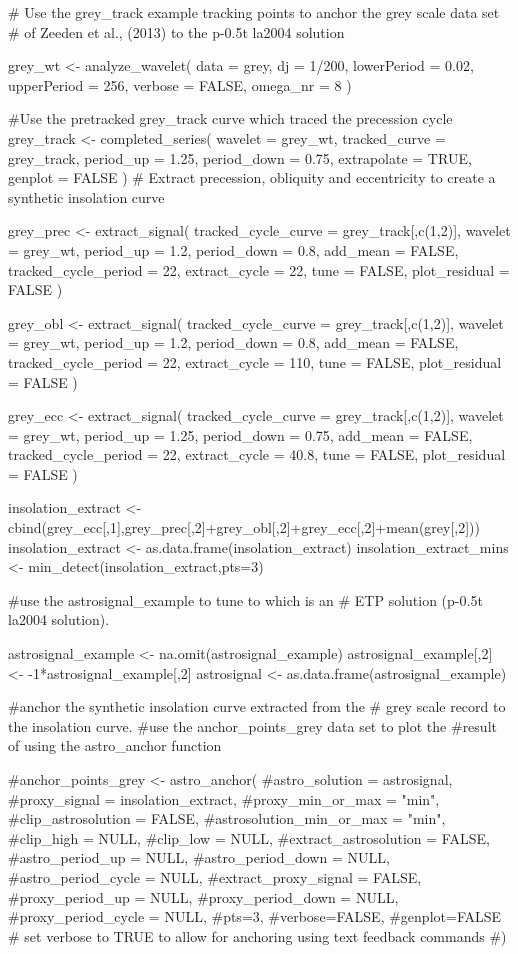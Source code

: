 \documentclass[a4paper]{book}
\begin{document}
%
\begin{Examples}
\begin{ExampleCode}

# Use the grey_track example tracking points to anchor the grey scale data set
# of Zeeden et al., (2013) to the p-0.5t la2004 solution

grey_wt <-
 analyze_wavelet(
   data = grey,
   dj = 1/200,
   lowerPeriod = 0.02,
   upperPeriod = 256,
   verbose = FALSE,
   omega_nr = 8
 )

#Use the pretracked grey_track curve which traced the precession cycle
grey_track <- completed_series(
 wavelet = grey_wt,
 tracked_curve  = grey_track,
 period_up  = 1.25,
 period_down  = 0.75,
 extrapolate = TRUE,
genplot = FALSE
)
# Extract precession, obliquity and eccentricity to create a synthetic insolation curve

grey_prec <- extract_signal(
tracked_cycle_curve = grey_track[,c(1,2)],
wavelet = grey_wt,
period_up = 1.2,
period_down = 0.8,
add_mean = FALSE,
tracked_cycle_period = 22,
extract_cycle = 22,
tune = FALSE,
plot_residual = FALSE
)

grey_obl <- extract_signal(
 tracked_cycle_curve = grey_track[,c(1,2)],
 wavelet = grey_wt,
 period_up = 1.2,
 period_down = 0.8,
 add_mean = FALSE,
 tracked_cycle_period = 22,
 extract_cycle = 110,
 tune = FALSE,
 plot_residual = FALSE
)

grey_ecc <- extract_signal(
 tracked_cycle_curve = grey_track[,c(1,2)],
 wavelet = grey_wt,
 period_up = 1.25,
 period_down = 0.75,
 add_mean = FALSE,
 tracked_cycle_period = 22,
 extract_cycle = 40.8,
 tune = FALSE,
 plot_residual = FALSE
)

insolation_extract <- cbind(grey_ecc[,1],grey_prec[,2]+grey_obl[,2]+grey_ecc[,2]+mean(grey[,2]))
insolation_extract <- as.data.frame(insolation_extract)
insolation_extract_mins <- min_detect(insolation_extract,pts=3)

#use the astrosignal_example to tune to which is an \cr
# ETP solution (p-0.5t la2004 solution).

astrosignal_example <- na.omit(astrosignal_example)
astrosignal_example[,2] <- -1*astrosignal_example[,2]
astrosignal <- as.data.frame(astrosignal_example)

#anchor the synthetic insolation curve extracted from the
# grey scale record to the insolation curve.
#use the anchor_points_grey data set to plot the
#result of using the astro_anchor function

#anchor_points_grey <- astro_anchor(
#astro_solution = astrosignal,
#proxy_signal = insolation_extract,
#proxy_min_or_max = "min",
#clip_astrosolution = FALSE,
#astrosolution_min_or_max = "min",
#clip_high = NULL,
#clip_low = NULL,
#extract_astrosolution  = FALSE,
#astro_period_up  = NULL,
#astro_period_down  = NULL,
#astro_period_cycle  = NULL,
#extract_proxy_signal  = FALSE,
#proxy_period_up  = NULL,
#proxy_period_down  = NULL,
#proxy_period_cycle  = NULL,
#pts=3,
#verbose=FALSE,
#genplot=FALSE # set verbose to TRUE to allow for anchoring using text feedback commands
#)



\end{ExampleCode}
\end{Examples}
\end{document}
